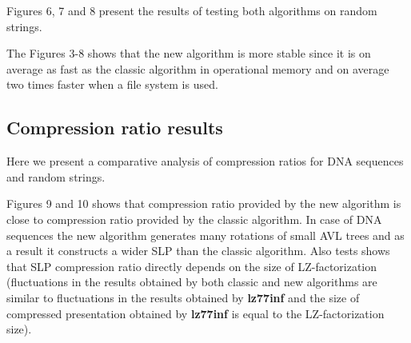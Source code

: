 \documentclass[10pt]{article}
\begin{document}
\begin{center}
	\DNARotations
\end{center}

\begin{center}
	\DNASpeedTestInMemory
\end{center}

\begin{center}
	\DNASpeedTestInFile
\end{center}

Figures 6, 7 and 8 present the results of testing both algorithms on random strings. 

\begin{center}
	\RandomRotations
\end{center}

\begin{center}
	\RandomSpeedTestInMemory
\end{center}

\begin{center}
	\RandomSpeedTestInFile
\end{center}

The Figures 3-8 shows that the new algorithm is more stable since it is on average as fast as the classic algorithm in
operational memory and on average two times faster when a file system is used.

\subsection{Compression ratio results}

Here we present a comparative analysis of compression ratios for DNA sequences and random strings.

Figures 9 and 10 shows that compression ratio provided by the new algorithm is close to compression ratio provided by
the classic algorithm. In case of DNA sequences the new algorithm generates many rotations of small AVL trees and as
a result it constructs a wider SLP than the classic algorithm. Also tests shows that SLP compression ratio directly
depends on the size of LZ-factorization (fluctuations in the results obtained by both classic and new algorithms are
similar to fluctuations in the results obtained by \textbf{lz77inf} and the size of compressed presentation obtained by
\textbf{lz77inf} is equal to the LZ-factorization size).

\begin{center}
	\DNACompression
\end{center}
\end{document}
